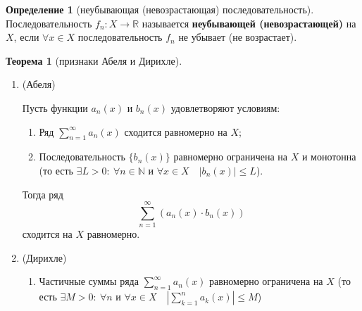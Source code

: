 \documentclass{report}
\theoremstyle{definition}
\newtheorem{definition}{Определение}[section]
\newtheorem{theorem}{Теорема}[section]
\begin{document}
\begin{definition}[неубывающая (невозрастающая) последовательность]
  Последовательность $f_n: X \rightarrow\mathbb{R}$ называется \textbf{неубывающей (невозрастающей)} на $X$, если $\forall x \in X$ последовательность $f_n$ не убывает (не возрастает).
\end{definition}

\begin{theorem}[признаки Абеля и Дирихле]
  \begin{enumerate}
    \item (Абеля)
    
    Пусть функции $a_n(x)$ и $b_n(x)$ удовлетворяют условиям:
    \begin{enumerate}
      \item Ряд $\sum_{n=1}^{\infty}a_n(x)$ сходится равномерно на $X$;
      \item Последовательность $\{b_n(x)\}$ равномерно ограничена на $X$ и монотонна (то есть $\exists L > 0: \ \forall n \in \mathbb{N}$ и $\forall x \in X \quad \big|b_n(x)\big| \leqslant L$).
    \end{enumerate}

    Тогда ряд
    \begin{equation*}
      \sum_{n=1}^{\infty}(a_n(x) \cdot b_n(x))
    \end{equation*}
    сходится на $X$ равномерно.

    \item (Дирихле)
    
    \begin{enumerate}
      \item Частичные суммы ряда $\sum_{n=1}^{\infty}a_n(x)$ равномерно ограничена на $X$ (то есть $\exists M > 0: \ \forall n$ и $\forall x \in X \quad |\sum_{k=1}^{n}a_k(x)| \leqslant M$)
    \end{enumerate}
  \end{enumerate}
\end{theorem}
\end{document}
